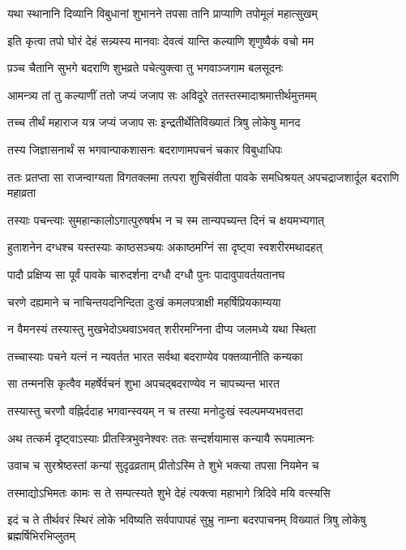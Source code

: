 \twolineshloka
{यथा स्थानानि दिव्यानि विबुधानां शुभानने}
{तपसा तानि प्राप्याणि तपोमूलं महात्सुखम्}


\twolineshloka
{इति कृत्वा तपो घोरं देहं सन्न्यस्य मानवाः}
{देवत्वं यान्ति कल्याणि शृणुष्वैकं वचो मम}


\twolineshloka
{प़ञ्च चैतानि सुभगे बदराणि शुभव्रते}
{पचेत्युक्त्वा तु भगवाञ्जगाम बलसूदनः}


\twolineshloka
{आमन्त्र्य तां तु कल्याणीं ततो जप्यं जजाप सः}
{अविदूरे ततस्तस्मादाश्रमात्तीर्थमुत्तमम्}


\twolineshloka
{तच्च तीर्थं महाराज यत्र जप्यं जजाप सः}
{इन्द्रतीर्थेतिविख्यातं त्रिषु लोकेषु मानद}


\twolineshloka
{तस्य जिज्ञासनार्थं स भगवान्पाकशासनः}
{बदराणामपचनं चकार विबुधाधिपः}


\threelineshloka
{ततः प्रतप्ता सा राजन्वाग्यता विगतक्लमा}
{तत्परा शुचिसंवीता पावके समधिश्रयत्}
{अपचद्राजशार्दूल बदराणि महाव्रता}


\twolineshloka
{तस्याः पचन्त्याः सुमहान्कालोऽगात्पुरुषर्षभ}
{न च स्म तान्यपच्यन्त दिनं च क्षयमभ्यगात्}


\twolineshloka
{हुताशनेन दग्धश्च यस्तस्याः काष्ठसञ्चयः}
{अकाष्ठमग्निं सा दृष्ट्वा स्वशरीरमथादहत्}


\twolineshloka
{पादौ प्रक्षिप्य सा पूर्वं पावके चारुदर्शना}
{दग्धौ दग्धौ पुनः पादावुपावर्तयतानघ}


\twolineshloka
{चरणे दह्यमाने च नाचिन्तयदनिन्दिता}
{दुःखं कमलपत्राक्षी महर्षिप्रियकाम्यया}


\twolineshloka
{न वैमनस्यं तस्यास्तु मुखभेदोऽथवाऽभवत्}
{शरीरमग्निना दीप्य जलमध्ये यथा स्थिता}


\twolineshloka
{तच्चास्याः पचने यत्नं न न्यवर्तत भारत}
{सर्वथा बदराण्येव पक्तव्यानीति कन्यका}


\twolineshloka
{सा तन्मनसि कृत्वैव महर्षेर्वचनं शुभा}
{अपचद्बदराण्येव न चापच्यन्त भारत}


\twolineshloka
{तस्यास्तु चरणौ वह्निर्ददाह भगवान्स्वयम्}
{न च तस्या मनोदुःखं स्वल्पमप्यभवत्तदा}


\twolineshloka
{अथ तत्कर्म दृष्ट्वाऽस्याः प्रीतस्त्रिभुवनेश्वरः}
{ततः सन्दर्शयामास कन्यायै रूपमात्मनः}


\twolineshloka
{उवाच च सुरश्रेष्ठस्तां कन्यां सुदृढव्रताम्}
{प्रीतोऽस्मि ते शुभे भक्त्या तपसा नियमेन च}


\twolineshloka
{तस्माद्योऽभिमतः कामः स ते सम्पत्स्यते शुभे}
{देहं त्यक्त्वा महाभागे त्रिदिवे मयि वत्स्यसि}


\threelineshloka
{इदं च ते तीर्थवरं स्थिरं लोके भविष्यति}
{सर्वपापापहं सुभ्रु नाम्ना बदरपाचनम्}
{विख्यातं त्रिषु लोकेषु ब्रह्मर्षिभिरभिप्लुतम्}


